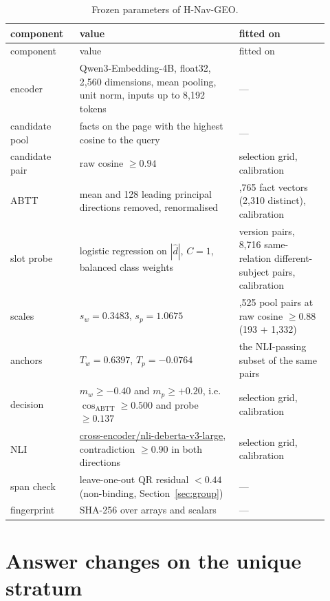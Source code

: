\documentclass[11pt]{article}
\newcommand{\code}[1]{\texttt{\detokenize{#1}}}          %
\newcommand{\geo}{H-Nav-GEO}
\begin{document}
\begin{longtable}{>{\raggedright\arraybackslash}p{0.20\linewidth}>{\raggedright\arraybackslash}p{0.46\linewidth}>{\raggedright\arraybackslash}p{0.26\linewidth}}
\caption{Frozen parameters of \geo{}.}\label{tab:frozen}\\
\toprule component & value & fitted on\\\midrule\endfirsthead
\toprule component & value & fitted on\\\midrule\endhead
encoder & Qwen3-Embedding-4B, float32, 2,560 dimensions, mean pooling, unit norm, inputs up to 8,192 tokens & ---\\
candidate pool & 50 facts on the page with the highest cosine to the query & ---\\
candidate pair & raw cosine $\ge0.94$ & selection grid, calibration\\
ABTT & mean and 128 leading principal directions removed, renormalised & 2,765 fact vectors (2,310 distinct), calibration\\
slot probe & logistic regression on $|\hat d|$, $C=1$, balanced class weights & 989 version pairs, 8,716 same-relation different-subject pairs, calibration\\
scales & $s_w=0.3483$, $s_p=1.0675$ & 1,525 pool pairs at raw cosine $\ge0.88$ (193 + 1,332)\\
anchors & $T_w=0.6397$, $T_p=-0.0764$ & the NLI-passing subset of the same pairs\\
decision & $m_w\ge-0.40$ and $m_p\ge+0.20$, i.e.\ $\cos_{\mathrm{ABTT}}\ge0.500$ and probe $\ge0.137$ & selection grid, calibration\\
NLI & \url{cross-encoder/nli-deberta-v3-large}, contradiction $\ge0.90$ in both directions & selection grid, calibration\\
span check & leave-one-out QR residual $<0.44$ (non-binding, Section~\ref{sec:group}) & ---\\
fingerprint & SHA-256 \code{335b4540...} over arrays and scalars & ---\\\bottomrule
\end{longtable}

\section{Answer changes on the unique stratum}
\label{app:flips}
\end{document}
